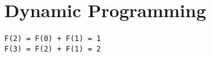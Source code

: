 \documentclass{article}
\begin{document}
\setcounter{section}{9}
\section{Dynamic Programming}
\begin{verbatim}
F(2) = F(0) + F(1) = 1
F(3) = F(2) + F(1) = 2
\end{verbatim}
\end{document}
